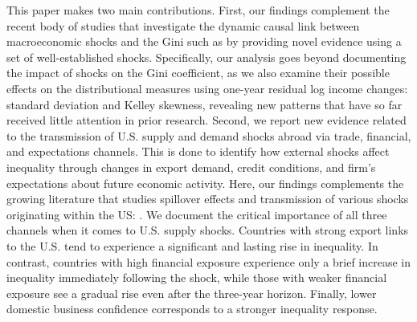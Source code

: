 \documentclass[12pt, a4paper]{article}
\begin{document}

This paper makes two main contributions. First, our findings complement the recent body of studies that investigate the dynamic causal link between macroeconomic shocks and the Gini such as \textcite{coibion2017innocent, Davtyan2017, furceri2018effects} by providing novel evidence using a set of well-established shocks. Specifically, our analysis goes beyond documenting the impact of shocks on the Gini coefficient, as we also examine their possible effects on the distributional measures using one-year residual log income changes: standard deviation and Kelley skewness, revealing new patterns that have so far received little attention in prior research. Second, we report new evidence related to the transmission of U.S. supply and demand shocks abroad via trade, financial, and expectations channels. This is done to identify how external shocks affect inequality through changes in export demand, credit conditions, and firm's expectations about future economic activity. Here, our findings complements the growing literature that studies spillover effects and transmission of various shocks originating within the US: \textcite{canova2005transmission, mackowiak2007external, akinci2013global, bowman2015us, dedola2017if, carrillo2020inquiry, levchenko2020tfp, di2022international, azad2022spillovers, lastauskas2023global, lastaukas2024}. We document the critical importance of all three channels when it comes to U.S. supply shocks. Countries with strong export links to the U.S. tend to experience a significant and lasting rise in inequality. In contrast, countries with high financial exposure experience only a brief increase in inequality immediately following the shock, while those with weaker financial exposure see a gradual rise even after the three-year horizon. Finally, lower domestic business confidence corresponds to a stronger inequality response.

\end{document}

